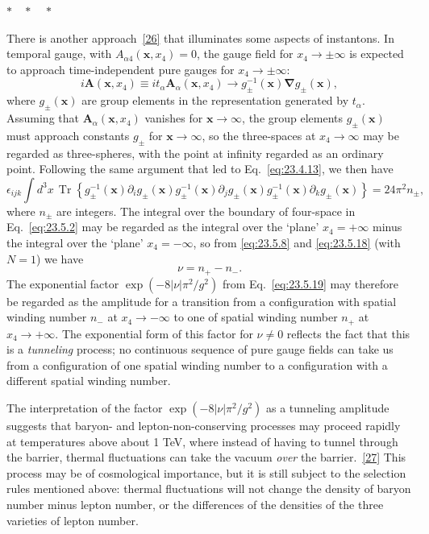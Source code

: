 \begin{center}
$* \quad * \quad *$
\end{center}

There is another approach~\hyperref[ch23-ref-26]{[26]} that illuminates
some aspects of instantons. In temporal gauge, with
$A_{\alpha4}(\mathbf x,x_4)=0$, the gauge field for
$x_4\to\pm\infty$ is expected to approach time-independent pure gauges
for $x_4\to\pm\infty$:
\begin{equation}
i\mathbf A(\mathbf x,x_4)\equiv
it_\alpha\mathbf A_\alpha(\mathbf x,x_4)
\longrightarrow
g_\pm^{-1}(\mathbf x)\boldsymbol{\nabla}g_\pm(\mathbf x),
\tag{23.5.24}\label{eq:23.5.24}
\end{equation}
where $g_\pm(\mathbf x)$ are group elements in the representation
generated by $t_\alpha$. Assuming that
$\mathbf A_\alpha(\mathbf x,x_4)$ vanishes for $\mathbf x\to\infty$, the
group elements $g_\pm(\mathbf x)$ must approach constants $g_\pm$ for
$\mathbf x\to\infty$, so the three-spaces at $x_4\to\infty$ may be
regarded as three-spheres, with the point at infinity regarded as an
ordinary point. Following the same argument that led to
Eq.~\eqref{eq:23.4.13}, we then have
\begin{equation}
\epsilon_{ijk}\int d^3x\,
\operatorname{Tr}\left\{
g_\pm^{-1}(\mathbf x)\partial_i g_\pm(\mathbf x)
g_\pm^{-1}(\mathbf x)\partial_j g_\pm(\mathbf x)
g_\pm^{-1}(\mathbf x)\partial_k g_\pm(\mathbf x)
\right\}
=24\pi^2n_\pm,
\tag{23.5.25}\label{eq:23.5.25}
\end{equation}
where $n_\pm$ are integers. The integral over the boundary of four-space
in Eq.~\eqref{eq:23.5.2} may be regarded as the integral over the `plane'
$x_4=+\infty$ minus the integral over the `plane' $x_4=-\infty$, so from
\eqref{eq:23.5.8} and \eqref{eq:23.5.18} (with $N=1$) we have
\begin{equation}
\nu=n_+-n_-.
\tag{23.5.26}\label{eq:23.5.26}
\end{equation}
The exponential factor $\exp(-8|\nu|\pi^2/g^2)$ from
Eq.~\eqref{eq:23.5.19} may therefore be regarded as the amplitude for a
transition from a configuration with spatial winding number $n_-$ at
$x_4\to-\infty$ to one of spatial winding number $n_+$ at
$x_4\to+\infty$. The exponential form of this factor for $\nu\ne0$
reflects the fact that this is a \emph{tunneling} process; no continuous
sequence of pure gauge fields can take us from a configuration of one
spatial winding number to a configuration with a different spatial
winding number.

The interpretation of the factor $\exp(-8|\nu|\pi^2/g^2)$ as a tunneling
amplitude suggests that baryon- and lepton-non-conserving processes may
proceed rapidly at temperatures above about 1 TeV, where instead of
having to tunnel through the barrier, thermal fluctuations can take the
vacuum \emph{over} the barrier.~\hyperref[ch23-ref-27]{[27]} This process
may be of cosmological importance, but it is still subject to the
selection rules mentioned above: thermal fluctuations will not change
the density of baryon number minus lepton number, or the differences of
the densities of the three varieties of lepton number.
